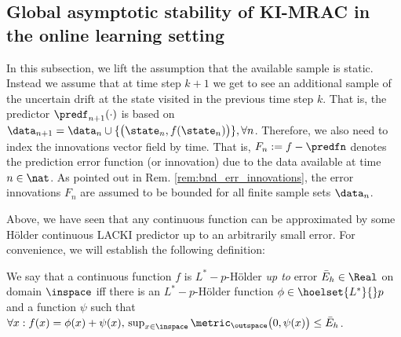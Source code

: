 \subsection{Global asymptotic stability of KI-MRAC in the online learning setting}
In this subsection, we lift the assumption that the available sample is static. Instead we assume that at time step $k+1$ we get to see an additional sample of the uncertain drift at the state visited in the previous time step $k$. 
That is, the predictor $\predf_{n+1}(\cdot)$ is based on $\data_{n+1} = \data_n \cup \{ \bigl(\state_n, f(\state_n) \bigr)\}, \forall n $.
Therefore, we also need to index the innovations vector field by time. That is, $F_n := f - \predfn$ denotes the prediction error function (or innovation) due to the data available at time $n \in \nat$. 
As pointed out in Rem. \ref{rem:bnd_err_innovations}, the error innovations $F_n$ are assumed to be bounded for all finite sample sets $\data_n$. 

Above, we have seen that any continuous function can be approximated by some H\"older continuous LACKI predictor up to an arbitrarily small error. 
For convenience, we will establish the following definition:

\begin{defn}
We say that a continuous function $f$ is $L^*-p$-H\"older \emph{up to} error $\bar E_h \in \Real$ on domain $\inspace$ iff there is an $L^*-p$-H\"older function $\phi \in \hoelset {L^*} { } p$ and a function $\psi$ such that $\forall x: f(x) = \phi(x)+\psi(x), \, \sup_{x \in \inspace} \metric_\outspace\bigl(0,\psi(x)\bigr) \leq \bar E_h$.
\end{defn}


 

